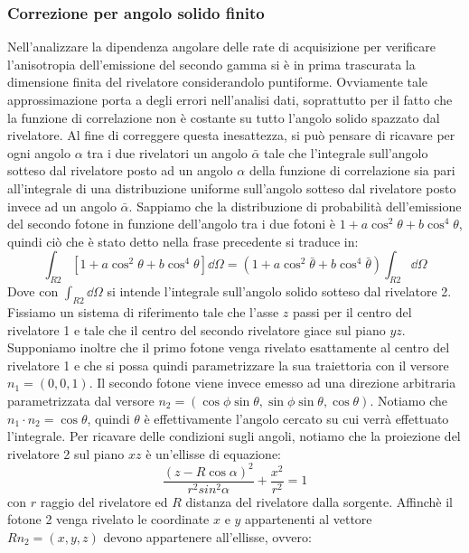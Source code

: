 \subsubsection{Correzione per angolo solido finito}

Nell'analizzare la dipendenza angolare delle rate di acquisizione per verificare l'anisotropia dell'emissione del secondo gamma si è in prima trascurata la dimensione finita del rivelatore 
considerandolo puntiforme. Ovviamente tale approssimazione porta a degli errori nell'analisi dati, soprattutto per il fatto che la funzione di correlazione non è costante su tutto l'angolo solido
spazzato dal rivelatore. Al fine di correggere questa inesattezza, si può pensare di ricavare per ogni angolo $\alpha$ tra i due rivelatori un angolo $\bar\alpha$ tale che l'integrale sull'angolo
sotteso dal rivelatore posto ad un angolo $\alpha$ della funzione di correlazione sia pari all'integrale di una distribuzione uniforme sull'angolo sotteso dal rivelatore posto invece ad un angolo 
$\bar\alpha$. Sappiamo che la distribuzione di probabilità dell'emissione del secondo fotone in funzione dell'angolo tra i due fotoni è $1 + a \cos ^ 2 \theta + b \cos^4 \theta $, quindi ciò che è 
stato detto nella frase precedente si traduce in:
$$ \int_{R2} \left[1 + a \cos ^ 2 \theta + b \cos^4 \theta \right] \dd \Omega = \left( 1 + a \cos ^ 2 \bar \theta + b \cos^4 \bar\theta \right) \int_{R2} \dd \Omega $$
Dove con $ \int_{R2} \dd \Omega $ si intende l'integrale sull'angolo solido sotteso dal rivelatore 2. Fissiamo un sistema di riferimento tale che l'asse $z$ passi per il centro del rivelatore 1 e tale che il
centro del secondo rivelatore giace sul piano $yz$. Supponiamo inoltre che il primo fotone venga rivelato esattamente al centro del rivelatore 1 e che si possa quindi parametrizzare la sua traiettoria con il 
versore $n_{1} = \left( 0, 0, 1 \right)$. Il secondo fotone viene invece emesso ad una direzione arbitraria parametrizzata dal versore $n_{2}= \left( \cos \phi \sin \theta, \sin \phi \sin \theta, \cos \theta \right)$.
Notiamo che $n_{1} \cdot n_{2} = \cos \theta $, quindi $\theta$ è effettivamente l'angolo cercato su cui verrà effettuato l'integrale. Per ricavare delle condizioni sugli angoli, notiamo che la proiezione 
del rivelatore 2 sul piano $xz$ è un'ellisse di equazione:
$$ \frac{\left( z - R \cos \alpha \right)^2}{r^2 sin^2 \alpha} + \frac{x^2}{r^2} = 1 $$
con $r$ raggio del rivelatore ed $R$ distanza del rivelatore dalla sorgente.
Affinchè il fotone 2 venga rivelato le coordinate \(x\) e \(y\) appartenenti al vettore $R n_2 = \left( x, y, z \right)$ devono appartenere all'ellisse, ovvero:
